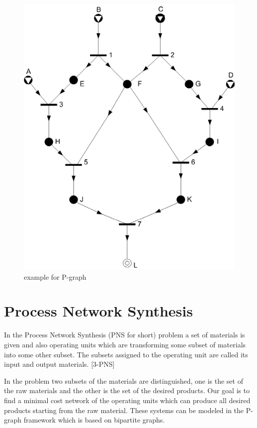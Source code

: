 \begin{figure}[th]
	\centering
		\includegraphics{chapiter2/img/examplePgraph}
	\caption{\label{fig:example for P-graph}example for P-graph }
\end{figure}

\section{ Process Network Synthesis }

In the Process Network Synthesis (PNS for short) problem a set of materials is given and also operating units 
which are transforming some subset of materials into some other subset.
The subsets assigned to the operating unit are called its  input and output materials. [3-PNS]

In the problem two subsets of the materials are distinguished, 
one is the set of the raw materials and the other is the set of the desired products.
Our goal is to find a minimal cost network of the operating units which can produce all desired products starting from the raw material. These systems can be modeled in the P-graph framework which is based on bipartite graphs.


